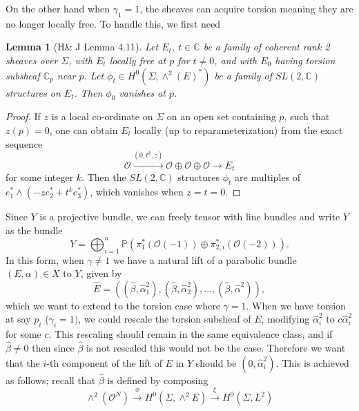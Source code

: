 \documentclass[]{article}
\newtheorem{lemma}{Lemma}
\newcommand{\C}{\mathbb{C}}
\newcommand{\OO}{\mathcal{O}}
\newcommand{\PP}{\mathbb{P}}
\begin{document}
On the other hand when $\gamma_1 = 1$, the sheaves can acquire torsion meaning they are no longer locally free. To handle this, we first need
\begin{lemma}[H\& J Lemma 4.11]
	Let $E_t$, $t\in\C$ be a family of coherent rank 2 sheaves over $\Sigma$, with $E_t$ locally free at $p$ for $t\neq 0$, and with $E_0$ having torsion subsheaf $\C_p$ near $p$. Let $\phi_t \in H^0(\Sigma, \wedge^2(E)^\ast)$ be a family of $SL(2,\C)$ structures on $E_t$. Then $\phi_0$ vanishes at $p$.
	\label{t:sl2-lemma}
\end{lemma}
\begin{proof}
	If $z$ is a local co-ordinate on $\Sigma$ on an open set containing $p$, such that $z(p)=0$, one can obtain $E_t$ locally (up to reparameterization) from the exact sequence 
	\begin{equation}
		\OO \xrightarrow{(0,t^k,z)} \OO \oplus \OO \oplus \OO \xrightarrow{~~~~~}E_t
	\end{equation}
	for some integer $k$. Then the $SL(2,\C)$ structures $\phi_t$ are multiples of $e_1^\ast \wedge (-ze^\ast_2 + t^k e^\ast_3)$, which vanishes when $z=t=0$.
\end{proof}
Since $Y$ is a projective bundle, we can freely tensor with line bundles and write $Y$ as the bundle
\begin{equation}
	Y = \bigoplus_{i=1}^n\PP\left(\pi_1^\ast\left(
	\OO(-1)
	\right)\oplus \pi_{2,i}^\ast\left(\OO(-2)\right)\right).
\end{equation}
In this form, when $\gamma \neq 1$ we have a natural lift of a parabolic bundle $(E,\alpha)\in X$ to $Y$, given by 
\begin{equation}
	\hat{E} = \left(
	(\hat{\beta}, \hat{\alpha}_1^2),(\hat{\beta},\hat{\alpha}_2^2),...,(\hat{\beta},\hat{\alpha}^2)
	\right),
\end{equation}
which we want to extend to the torsion case where $\gamma = 1$. When we have torsion at say $p_i$ ($\gamma_i = 1)$, we could rescale the torsion subsheaf of $E$, modifying $\hat{\alpha}_i^2$ to $c\hat{\alpha}_i^2$ for some $c$. This rescaling should remain in the same equivalence class, and if $\hat{\beta} \neq 0$ then since $\hat{\beta}$ is not rescaled this would not be the case. Therefore we want that the $i$-th component of the lift of $E$ in $Y$ should be $(0,\hat{\alpha}_i^2)$. This is achieved as follows; recall that $\hat{\beta}$ is defined by composing
\begin{equation}
	\wedge^2(\OO^N) \xrightarrow{\phi} H^0(\Sigma, \wedge^2 E) \xrightarrow{\xi} H^0(\Sigma, L^2)
\end{equation}
\end{document}
